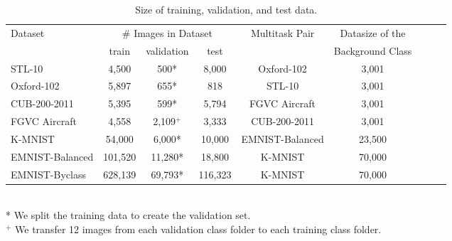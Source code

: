 \documentclass{article}
\begin{document}
\begin{table*}[t]
\caption{Size of training, validation, and test data.}
\label{Datasize}
\vskip 0.15in
\begin{center}
\begin{small}
\begin{sc}
\begin{tabular}{lcccccccr}
\toprule
Dataset  &\multicolumn{3}{c}{\# Images in Dataset} & Multitask Pair& Datasize of the \\
 &    train & validation & test & & Background Class \\
\midrule  
STL-10  &4,500&500*&8,000&Oxford-102 & 3,001 \\
Oxford-102 &5,897&655*&818&STL-10 & 3,001\\



CUB-200-2011 &5,395&599*&5,794&FGVC Aircraft& 3,001\\

FGVC Aircraft &4,558 &2,109$^{+}$ &3,333 &CUB-200-2011 & 3,001\\
K-MNIST  &54,000&6,000*&10,000&EMNIST-Balanced  & 23,500\\
EMNIST-Balanced &101,520&11,280*&18,800&K-MNIST & 70,000 \\
EMNIST-Byclass &628,139&69,793*&116,323&K-MNIST & 70,000 \\


\bottomrule
\end{tabular}
\\ * We split the training data to create the validation set. 
\\ $^{+}$ We transfer 12 images from each validation class folder to each training class folder. 
\end{sc}
\end{small}
\end{center}
\vskip -0.1in
\end{table*}
\end{document}

